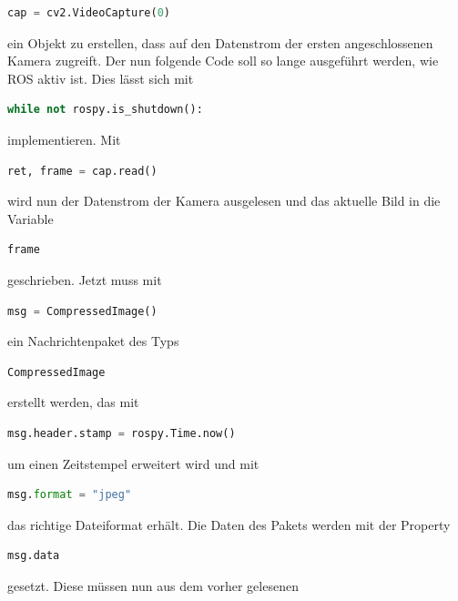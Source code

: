 \begin{lstlisting}[language=Python]
cap = cv2.VideoCapture(0)
\end{lstlisting}

ein Objekt zu erstellen, dass auf den Datenstrom der ersten angeschlossenen Kamera zugreift. Der nun folgende Code soll so lange ausgeführt werden, wie ROS aktiv ist. Dies lässt sich mit 

\begin{lstlisting}[language=Python]
while not rospy.is_shutdown():
\end{lstlisting}

implementieren. Mit 

\begin{lstlisting}[language=Python]
ret, frame = cap.read()
\end{lstlisting}

wird nun der Datenstrom der Kamera ausgelesen und das aktuelle Bild in die Variable 

\begin{lstlisting}[language=Python]
frame
\end{lstlisting}

geschrieben. Jetzt muss mit 

\begin{lstlisting}[language=Python]
msg = CompressedImage()
\end{lstlisting}

ein Nachrichtenpaket des Typs 

\begin{lstlisting}[language=Python]
CompressedImage
\end{lstlisting}

erstellt werden, das mit 

\begin{lstlisting}[language=Python]
msg.header.stamp = rospy.Time.now()
\end{lstlisting}

um einen Zeitstempel erweitert wird und mit 

\begin{lstlisting}[language=Python]
msg.format = "jpeg"
\end{lstlisting}

das richtige Dateiformat erhält. Die Daten des Pakets werden mit der Property 

\begin{lstlisting}[language=Python]
msg.data
\end{lstlisting}

gesetzt. Diese müssen nun aus dem vorher gelesenen 

